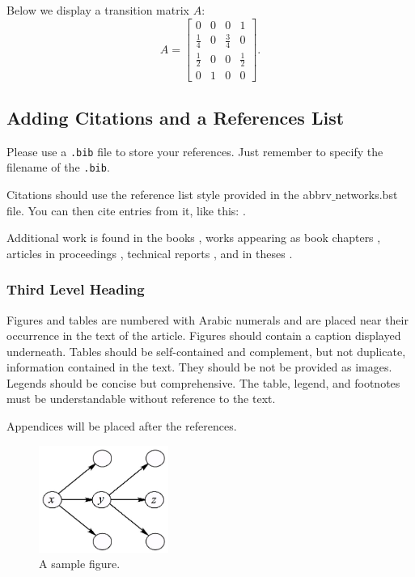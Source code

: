 \documentclass[num-refs]{wiley-networks}
\begin{document}
Below we display a transition matrix $A$:
\[
A = \begin{bmatrix}
0 & 0 & 0 & 1\\
\frac{1}{4} & 0 & \frac{3}{4} & 0\\[.06cm]
\frac{1}{2} & 0 & 0 & \frac{1}{2}\\[.05cm]
0 & 1 & 0 & 0
       \end{bmatrix}.
\]




\subsection{Adding Citations and a References List}

Please use a \verb|.bib| file to store your references. Just remember to specify the filename of the \verb|.bib|.

Citations should use the reference list style provided in the  abbrv$\_$networks.bst file. You can then cite entries from it, like this: \cite{Adams}. 


Additional work is found in the books \cite{AhujaEtal, vonNeumann}, works appearing as book chapters \cite{ReadTutte, Shapiro}, articles in proceedings \cite{Goemans, Seibert}, technical reports \cite{Jones}, and in theses \cite{Ponza, Wilson}.





\subsubsection{Third Level Heading}
Figures and tables are numbered with Arabic numerals and are placed near their occurrence in the text of the article. 
Figures should contain a caption displayed underneath.
Tables should be self-contained and complement, but not duplicate, information contained in the text. They should be not be provided as images. Legends should be concise but comprehensive. The table, legend, and footnotes must be understandable without reference to the text.

Appendices will be placed after the references. 

\begin{figure}[h!]
\centering
\includegraphics[width=120pt]{figure2aa}
\caption{A sample figure.}
\end{figure}
\end{document}
